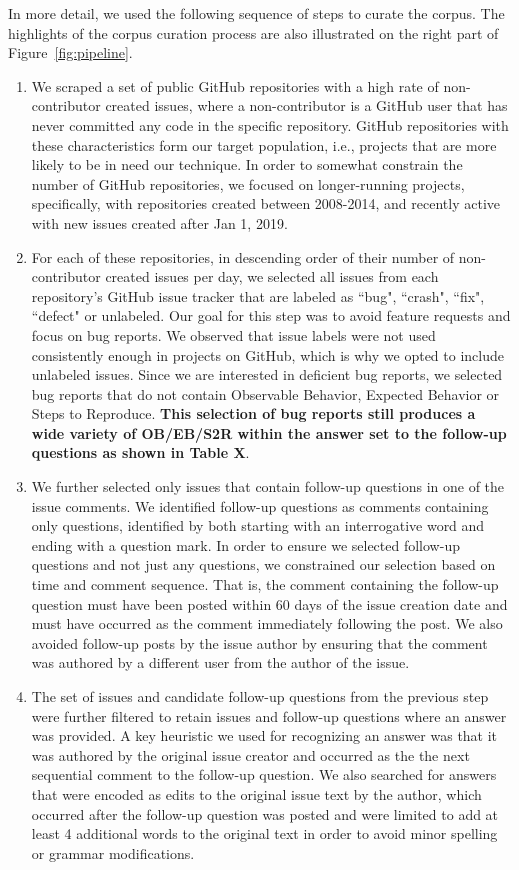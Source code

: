In more detail, we used the following sequence of steps to curate the corpus. The highlights of the corpus curation process are also illustrated on the right part of Figure~\ref{fig:pipeline}.
\begin{enumerate}
\item We scraped a set of public GitHub repositories with a high rate of
non-contributor created issues, where a non-contributor is a GitHub user that has never
committed any code in the specific repository. GitHub repositories with these characteristics form
our target population, i.e., projects that are more likely to be in need our technique. In order
to somewhat constrain the number of GitHub repositories, we focused on longer-running projects,
specifically, with repositories created between 2008-2014, and recently active with new issues created after Jan 1, 2019.
\item For each of these repositories, in descending order of their number of non-contributor created issues per day,
we selected all issues from each repository's GitHub issue tracker that are labeled as ``bug", ``crash", ``fix", ``defect" or unlabeled.
Our goal for this step was to avoid feature requests and focus on bug reports. We observed that issue labels were not used consistently enough
in projects on GitHub, which is why we opted to include unlabeled issues. Since we are interested in deficient bug reports, we selected bug reports that do not contain Observable Behavior, Expected Behavior or Steps to Reproduce. {\bf This selection of bug reports still produces a wide variety of OB/EB/S2R within the answer set to the follow-up questions as shown in Table X}.
\item We further selected only issues that contain follow-up questions in one of the issue comments.  We identified follow-up questions as  comments containing only questions, identified by both starting with an interrogative word and ending with a question mark. In order to ensure we selected follow-up questions and not just
any questions, we constrained our selection based on time and comment sequence. That is, the comment containing the follow-up question must have been posted within 60 days of the issue creation date and must have occurred as the comment immediately following the post. We also avoided follow-up posts by the issue author by ensuring that the comment was authored by a different user from the author of the issue.
\item The set of issues and candidate follow-up questions from the previous step were further filtered to
retain issues and follow-up questions where an answer was provided. A key heuristic we used for recognizing an answer was that it was authored
by the original issue creator and occurred as the the next sequential comment
to the follow-up question. We also searched for answers that were encoded as edits to the original issue text by the author, which occurred after the follow-up question was posted and were limited to add at least 4 additional words to the original text in order to avoid minor spelling or grammar modifications.
\end{enumerate}
